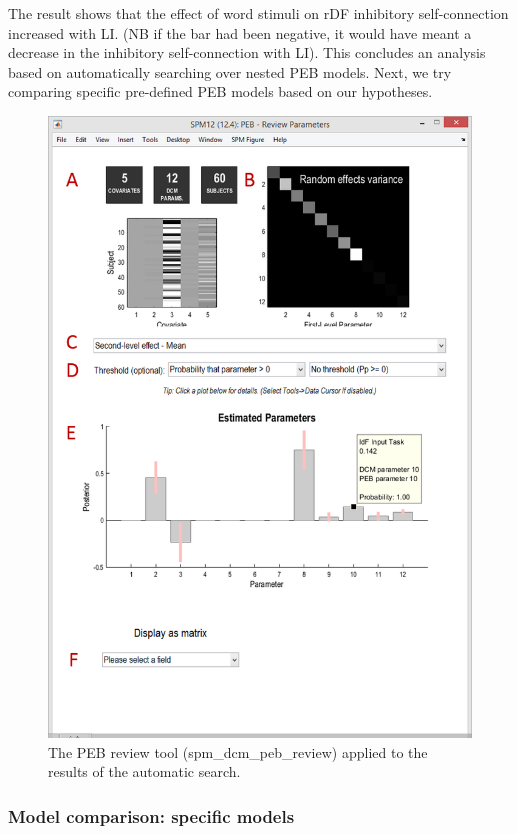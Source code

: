 \documentclass{article}
\begin{document}
The result shows that the effect of word stimuli on rDF inhibitory self-connection increased with LI. (NB if the bar had been negative, it would have meant a decrease in the inhibitory self-connection with LI). This concludes an analysis based on automatically searching over nested PEB models. Next, we try comparing specific pre-defined PEB models based on our hypotheses.

\begin{figure}[ht]
\begin{center}
\includegraphics{"Fig_peb_search_review"}
\caption{The PEB review tool (spm\_dcm\_peb\_review) applied to the results of the automatic search.\label{Fig_peb_search_review}}
\end{center}
\end{figure}

\subsubsection{Model comparison: specific models} \label{GUI_specificDCMs}
\end{document}
